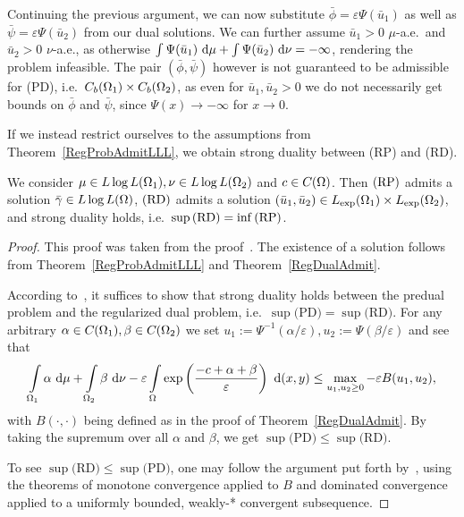 Continuing the previous argument, we can now substitute $\bar{\phi} = \varepsilon \Psi(\bar{u}_1)$ as well as $\bar{\psi} = \varepsilon \Psi(\bar{u}_2)$ from our dual solutions. We can further assume $\bar{u}_1 > 0$ $\mu$-a.e.\ and $\bar{u}_2 > 0$ $\nu$-a.e., as otherwise $\int \Psi(\bar{u}_1)~\D + \int \Psi(\bar{u}_2)~\D[\nu] = -\infty$, rendering the problem infeasible. The pair $(\bar{\phi}, \bar{\psi})$ however is not guaranteed to be admissible for (PD), i.e.~$\CF[b]{\Omega_1} \times \CF[b]{\Omega_2}$, as even for $\bar{u}_1, \bar{u}_2 > 0$ we do not necessarily get bounds on $\bar{\phi}$ and $\bar{\psi}$, since $\Psi(x) \rightarrow -\infty$ for $x \rightarrow 0$.

If we instead restrict ourselves to the assumptions from Theorem~\ref{RegProbAdmitLLL}, we obtain strong duality between (RP) and (RD).

\begin{theorem}\label{RegStrongDualityLLL}
	We consider $\mu \in \LLL[\Omega_1], \nu \in \LLL[\Omega_2]$ and $c \in \CF{\Omega}$. Then$\text{\normalfont\ (RP)}$ admits a solution $\bar{\gamma} \in \LLL$,$\text{\normalfont\ (RD)}$ admits a solution $(\bar{u}_1, \bar{u}_2) \in \Lexp[\Omega_1] \times \Lexp[\Omega_2]$, and strong duality holds, i.e.\ $\sup\!\text{\normalfont\,(RD)} = \inf\!\text{\normalfont\,(RP)}$.
\end{theorem}

\begin{proof}
	This proof was taken from the proof\ \cite[Proposition~4.7]{Cla2021}. The existence of a solution follows from Theorem~\ref{RegProbAdmitLLL} and Theorem~\ref{RegDualAdmit}.

	According to\ \cite[Proposition~3.1]{Cla2021}, it suffices to show that strong duality holds between the predual problem and the regularized dual problem, i.e.\ $\sup \text{(PD)} = \sup \text{(RD)}$. For any arbitrary $\alpha \in \CF{\Omega_1}, \beta \in \CF{\Omega_2}$ we set $u_1 := \Psi^{-1}(\alpha/\varepsilon), u_2 := \Psi(\beta/\varepsilon)$ and see that
	\[ \int\limits_{\Omega_1} \alpha~\D + \int\limits_{\Omega_2} \beta~\D[\nu] - \varepsilon \int\limits_\Omega \exp\left( \frac{-c + \alpha + \beta}{\varepsilon} \right)~\D[(x, y)] \le \max\limits_{u_1, u_2 \ge 0} -\varepsilon B(u_1, u_2), \]
	with $B(\cdot, \cdot)$ being defined as in the proof of Theorem~\ref{RegDualAdmit}. By taking the supremum over all $\alpha$ and $\beta$, we get $\sup \text{(PD)} \le \sup \text{(RD)}$.

	To see $\sup \text{(RD)} \le \sup \text{(PD)}$, one may follow the argument put forth by\ \cite{Cla2021}, using the theorems of monotone convergence applied to $B$ and dominated convergence applied to a uniformly bounded, weakly-* convergent subsequence.
\end{proof}

